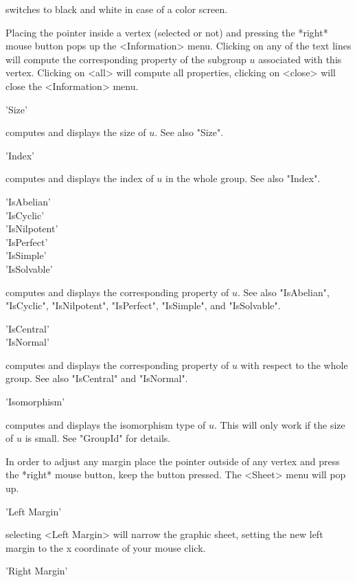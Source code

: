 switches to black and white in case of a color screen.


Placing the pointer  inside a vertex (selected  or not)  and pressing the
*right* mouse button pops up the  <Information> menu.  Clicking on any of
the text  lines will compute  the corresponding  property of the subgroup
$u$ associated  with  this vertex.  Clicking   on <all> will  compute all
properties, clicking on <close> will close the <Information> menu.

'Size'

computes and displays the size of $u$.  See also "Size".

'Index'

computes and displays the  index  of $u$ in   the whole group.  See  also
"Index".

'IsAbelian' \\
'IsCyclic' \\
'IsNilpotent' \\
'IsPerfect' \\
'IsSimple' \\
'IsSolvable'

computes  and displays  the corresponding property    of $u$.   See  also
"IsAbelian",  "IsCyclic",  "IsNilpotent",  "IsPerfect",  "IsSimple",  and
"IsSolvable".


'IsCentral' \\
'IsNormal'

computes and displays the corresponding  property of $u$ with respect  to
the whole group.  See also "IsCentral" and "IsNormal".

'Isomorphism'

computes and displays  the isomorphism type of  $u$.  This will only work
if the size of $u$ is small.  See "GroupId" for details.



In order to adjust any margin place the pointer outside of any vertex and
press the  *right* mouse  button,  keep the button  pressed.  The <Sheet>
menu will pop up.

'Left Margin'

selecting <Left  Margin> will narrow the  graphic sheet, setting  the new
left margin to the x coordinate of your mouse click.

'Right Margin'

